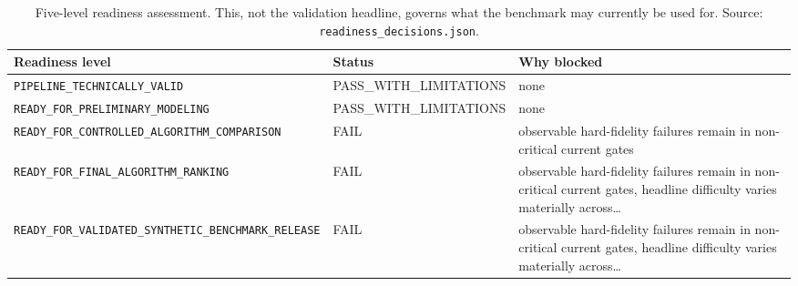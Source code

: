 \begin{table}[htbp]
\centering
\small
\caption{Five-level readiness assessment. This, not the validation headline, governs what the benchmark may currently be used for. Source: \texttt{readiness\_decisions.json}.}
\label{tab:readiness}
\begin{tabularx}{\textwidth}{ll>{\raggedright\arraybackslash}X}
\toprule
Readiness level & Status & Why blocked \\
\midrule
\texttt{\scriptsize PIPELINE\_TECHNICALLY\_VALID} & PASS\_WITH\_LIMITATIONS & none \\
\texttt{\scriptsize READY\_FOR\_PRELIMINARY\_MODELING} & PASS\_WITH\_LIMITATIONS & none \\
\texttt{\scriptsize READY\_FOR\_CONTROLLED\_ALGORITHM\_COMPARISON} & FAIL & observable hard-fidelity failures remain in non-critical current gates \\
\texttt{\scriptsize READY\_FOR\_FINAL\_ALGORITHM\_RANKING} & FAIL & observable hard-fidelity failures remain in non-critical current gates, headline difficulty varies materially across… \\
\texttt{\scriptsize READY\_FOR\_VALIDATED\_SYNTHETIC\_BENCHMARK\_RELEASE} & FAIL & observable hard-fidelity failures remain in non-critical current gates, headline difficulty varies materially across… \\
\bottomrule
\end{tabularx}
\end{table}

